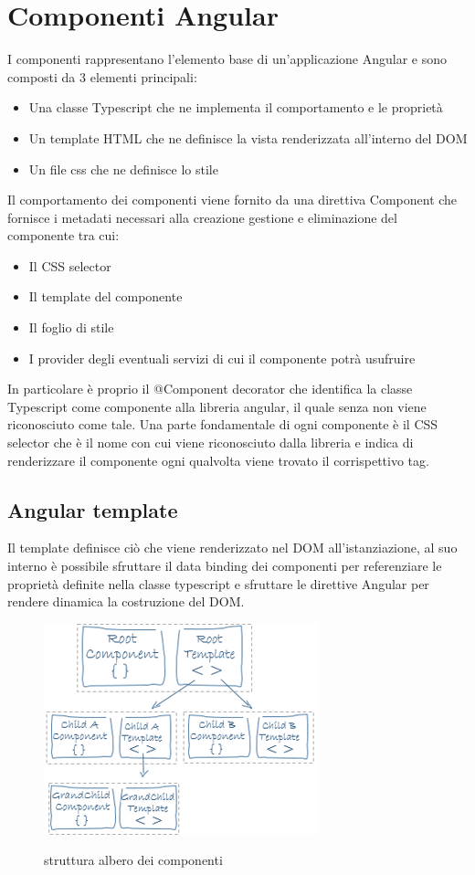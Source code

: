 \section{Componenti Angular}
I componenti rappresentano l'elemento base di un'applicazione Angular e sono composti da 3 elementi principali:
\begin{itemize}
    \item Una classe Typescript che ne implementa il comportamento e le proprietà 
    \item Un template HTML che ne definisce la vista renderizzata all'interno del DOM 
    \item Un file css che ne definisce lo stile
\end{itemize}
Il comportamento dei componenti viene fornito da una direttiva Component che fornisce i metadati necessari alla creazione gestione e eliminazione del componente tra cui:
\begin{itemize}
    \item Il CSS selector
    \item Il template del componente
    \item Il foglio di stile 
    \item I provider degli eventuali servizi di cui il componente potrà usufruire
\end{itemize}
In particolare è proprio il @Component decorator che identifica la classe Typescript come componente alla libreria angular, il quale senza non viene riconosciuto come tale.
\newline
Una parte fondamentale di ogni componente è il CSS selector che è il nome con cui viene riconosciuto dalla libreria e indica di renderizzare il componente ogni qualvolta viene trovato il corrispettivo tag.
\newline
\subsection{Angular template}
Il template definisce ciò che viene renderizzato nel DOM all'istanziazione,
al suo interno è possibile sfruttare il data binding dei componenti  per referenziare le proprietà definite nella classe typescript e sfruttare le direttive Angular per rendere dinamica la costruzione del DOM. 
\newline
\newline
\begin{figure}[H]
    \centering
    \includegraphics[scale=1]{resources/component-tree.png}
    \cite{angular-doc}
    \caption{struttura albero dei componenti}
\end{figure}

